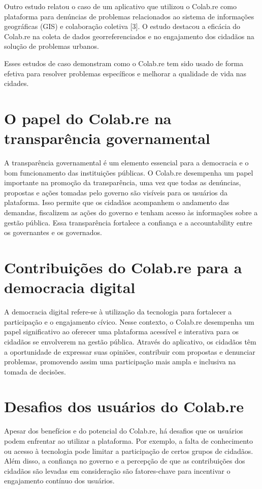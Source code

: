 Outro estudo relatou o caso de um aplicativo que utilizou o Colab.re como plataforma para denúncias de problemas relacionados ao sistema de informações geográficas (GIS) e colaboração coletiva [3]. O estudo destacou a eficácia do Colab.re na coleta de dados georreferenciados e no engajamento dos cidadãos na solução de problemas urbanos.

Esses estudos de caso demonstram como o Colab.re tem sido usado de forma efetiva para resolver problemas específicos e melhorar a qualidade de vida nas cidades.

\section*{O papel do Colab.re na transparência governamental}
A transparência governamental é um elemento essencial para a democracia e o bom funcionamento das instituições públicas. O Colab.re desempenha um papel importante na promoção da transparência, uma vez que todas as denúncias, propostas e ações tomadas pelo governo são visíveis para os usuários da plataforma. Isso permite que os cidadãos acompanhem o andamento das demandas, fiscalizem as ações do governo e tenham acesso às informações sobre a gestão pública. Essa transparência fortalece a confiança e a accountability entre os governantes e os governados.

\section*{Contribuições do Colab.re para a democracia digital}
A democracia digital refere-se à utilização da tecnologia para fortalecer a participação e o engajamento cívico. Nesse contexto, o Colab.re desempenha um papel significativo ao oferecer uma plataforma acessível e interativa para os cidadãos se envolverem na gestão pública. Através do aplicativo, os cidadãos têm a oportunidade de expressar suas opiniões, contribuir com propostas e denunciar problemas, promovendo assim uma participação mais ampla e inclusiva na tomada de decisões.

\section*{Desafios dos usuários do Colab.re}
Apesar dos benefícios e do potencial do Colab.re, há desafios que os usuários podem enfrentar ao utilizar a plataforma. Por exemplo, a falta de conhecimento ou acesso à tecnologia pode limitar a participação de certos grupos de cidadãos. Além disso, a confiança no governo e a percepção de que as contribuições dos cidadãos são levadas em consideração são fatores-chave para incentivar o engajamento contínuo dos usuários.

